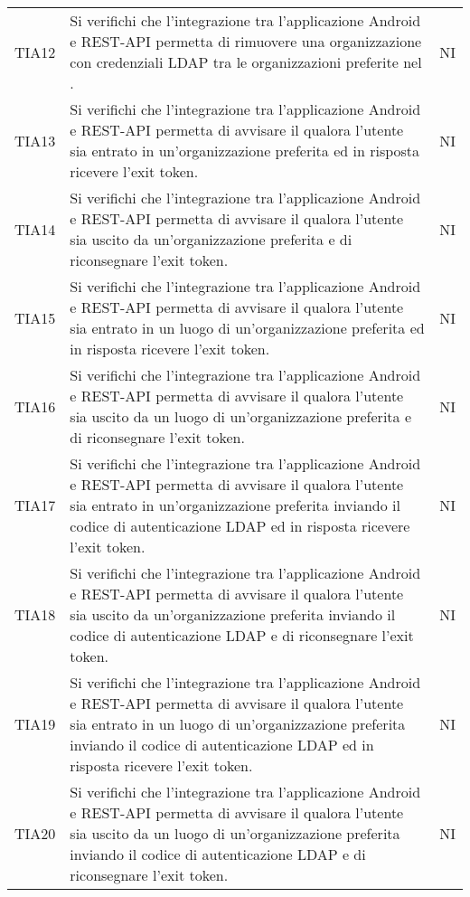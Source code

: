 {\begin{longtable}{ c C{8.5cm} C{1cm}}
TIA12 & Si verifichi che l’integrazione tra l’applicazione Android e REST-API permetta di rimuovere una organizzazione con credenziali LDAP tra le organizzazioni preferite nel . & NI \\
TIA13 & Si verifichi che l’integrazione tra l’applicazione Android e REST-API permetta di avvisare il  qualora l'utente sia entrato in un'organizzazione preferita ed in risposta ricevere l'exit token. & NI \\
TIA14 & Si verifichi che l’integrazione tra l’applicazione Android e REST-API permetta di avvisare il  qualora l'utente sia uscito da un'organizzazione preferita e di riconsegnare l'exit token. & NI \\
TIA15 & Si verifichi che l’integrazione tra l’applicazione Android e REST-API permetta di avvisare il  qualora l'utente sia entrato in un luogo di un'organizzazione preferita ed in risposta ricevere l'exit token. & NI \\
TIA16 & Si verifichi che l’integrazione tra l’applicazione Android e REST-API permetta di avvisare il  qualora l'utente sia uscito da un luogo di un'organizzazione preferita e di riconsegnare l'exit token. & NI \\
TIA17 & Si verifichi che l’integrazione tra l’applicazione Android e REST-API permetta di avvisare il  qualora l'utente sia entrato in un'organizzazione preferita inviando il codice di autenticazione LDAP ed in risposta ricevere l'exit token. & NI \\
TIA18 & Si verifichi che l’integrazione tra l’applicazione Android e REST-API permetta di avvisare il  qualora l'utente sia uscito da un'organizzazione preferita inviando il codice di autenticazione LDAP e di riconsegnare l'exit token. & NI \\
TIA19 & Si verifichi che l’integrazione tra l’applicazione Android e REST-API permetta di avvisare il  qualora l'utente sia entrato in un luogo di un'organizzazione preferita inviando il codice di autenticazione LDAP ed in risposta ricevere l'exit token. & NI \\
TIA20 & Si verifichi che l’integrazione tra l’applicazione Android e REST-API permetta di avvisare il  qualora l'utente sia uscito da un luogo di un'organizzazione preferita inviando il codice di autenticazione LDAP e di riconsegnare l'exit token. & NI \\


\end{longtable}}
